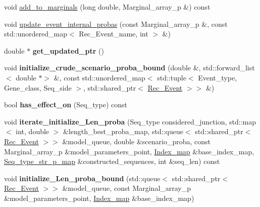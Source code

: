\begin{DoxyCompactItemize}
void \hyperlink{classDinucl__markov_a63fd37e31c3e32fee54dc26146bc3fac}{add\+\_\+to\+\_\+marginals} (long double, Marginal\+\_\+array\+\_\+p \&) const
\item 
void \hyperlink{classDinucl__markov_a8da33acb0a389a0a4c845a69c11b173c}{update\+\_\+event\+\_\+internal\+\_\+probas} (const Marginal\+\_\+array\+\_\+p \&, const std\+::unordered\+\_\+map$<$ Rec\+\_\+\+Event\+\_\+name, int $>$ \&)
\item 
\mbox{\label{classDinucl__markov_ad19e4458a31477f56f18150e7ea3f731}} 
double $\ast$ {\bfseries get\+\_\+updated\+\_\+ptr} ()
\item 
\mbox{\label{classDinucl__markov_a146a953912fbdd13dda74693b2972981}} 
void {\bfseries initialize\+\_\+crude\+\_\+scenario\+\_\+proba\+\_\+bound} (double \&, std\+::forward\+\_\+list$<$ double $\ast$$>$ \&, const std\+::unordered\+\_\+map$<$ std\+::tuple$<$ Event\+\_\+type, Gene\+\_\+class, Seq\+\_\+side $>$, std\+::shared\+\_\+ptr$<$ \hyperlink{classRec__Event}{Rec\+\_\+\+Event} $>$$>$ \&)
\item 
\mbox{\label{classDinucl__markov_a00c9b729b4984421c444f9543d241f6c}} 
bool {\bfseries has\+\_\+effect\+\_\+on} (Seq\+\_\+type) const
\item 
\mbox{\label{classDinucl__markov_a93c1b5d8073d5456419e87452f800027}} 
void {\bfseries iterate\+\_\+initialize\+\_\+\+Len\+\_\+proba} (Seq\+\_\+type considered\+\_\+junction, std\+::map$<$ int, double $>$ \&length\+\_\+best\+\_\+proba\+\_\+map, std\+::queue$<$ std\+::shared\+\_\+ptr$<$ \hyperlink{classRec__Event}{Rec\+\_\+\+Event} $>$$>$ \&model\+\_\+queue, double \&scenario\+\_\+proba, const Marginal\+\_\+array\+\_\+p \&model\+\_\+parameters\+\_\+point, \hyperlink{classEnum__fast__memory__map}{Index\+\_\+map} \&base\+\_\+index\+\_\+map, \hyperlink{classEnum__fast__memory__map}{Seq\+\_\+type\+\_\+str\+\_\+p\+\_\+map} \&constructed\+\_\+sequences, int \&seq\+\_\+len) const
\item 
\mbox{\label{classDinucl__markov_a7fc4210d8943892078c6eeec7ddcfbd8}} 
void {\bfseries initialize\+\_\+\+Len\+\_\+proba\+\_\+bound} (std\+::queue$<$ std\+::shared\+\_\+ptr$<$ \hyperlink{classRec__Event}{Rec\+\_\+\+Event} $>$$>$ \&model\+\_\+queue, const Marginal\+\_\+array\+\_\+p \&model\+\_\+parameters\+\_\+point, \hyperlink{classEnum__fast__memory__map}{Index\+\_\+map} \&base\+\_\+index\+\_\+map)
\end{DoxyCompactItemize}
